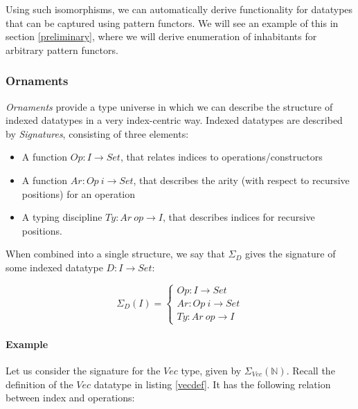 \documentclass[11pt]{article}
\newcommand{\Conid}[1]{\mathit{#1}}
\newcommand{\Varid}[1]{\mathit{#1}}
\def\resethooks{%
  \global\let\SaveRestoreHook\empty
  \global\let\ColumnHook\empty}
\let\hspre\empty
\let\hspost\empty
\renewcommand\Varid[1]{\mathord{\textsf{#1}}}
\let\Conid\Varid
\begin{document}
Using such isomorphisms, we can automatically derive functionality for datatypes that can be captured using pattern functors. We will see an example of this in section \ref{preliminary}, where we will derive enumeration of inhabitants for arbitrary pattern functors. 

\subsubsection{Ornaments}

\textit{Ornaments} \cite{dagand2017essence} provide a type universe in which we can describe the structure of indexed datatypes in a very index-centric way. Indexed datatypes are described by \textit{Signatures}, consisting of three elements:

\begin{itemize}
\item 
A function $Op : I \rightarrow Set$, that relates indices to operations/constructors

\item 
A function $Ar : Op\ i \rightarrow Set$, that describes the arity (with respect to recursive positions) for an operation 

\item 
A typing discipline $Ty : Ar\ op \rightarrow I$, that describes indices for recursive positions. 

\end{itemize}

When combined into a single structure, we say that $\Sigma_D$ gives the signature of some indexed datatype $D : I \rightarrow Set$:  

\begin{equation*}
\Sigma_D(I)=
\begin{cases}
Op : I \rightarrow Set \\
Ar : Op\ i \rightarrow Set \\
Ty : Ar\ op \rightarrow I
\end{cases}
\end{equation*}

\paragraph{Example} Let us consider the signature for the $Vec$ type, given by $\Sigma_{Vec}(\mathbb{N})$. Recall the definition of the $Vec$ datatype in listing \ref{vecdef}. It has the following relation between index and operations: 

\resethooks
\end{document}
